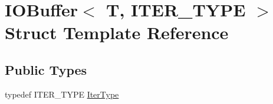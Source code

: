 \hypertarget{structIOBuffer}{\section{I\-O\-Buffer$<$ T, I\-T\-E\-R\-\_\-\-T\-Y\-P\-E $>$ Struct Template Reference}
\label{structIOBuffer}
}
\subsection*{Public Types}
\begin{DoxyCompactItemize}
\item 
typedef I\-T\-E\-R\-\_\-\-T\-Y\-P\-E \hyperlink{structIOBuffer_ab4571677106318f7fd246c9536292354}{Iter\-Type}
\end{DoxyCompactItemize}
